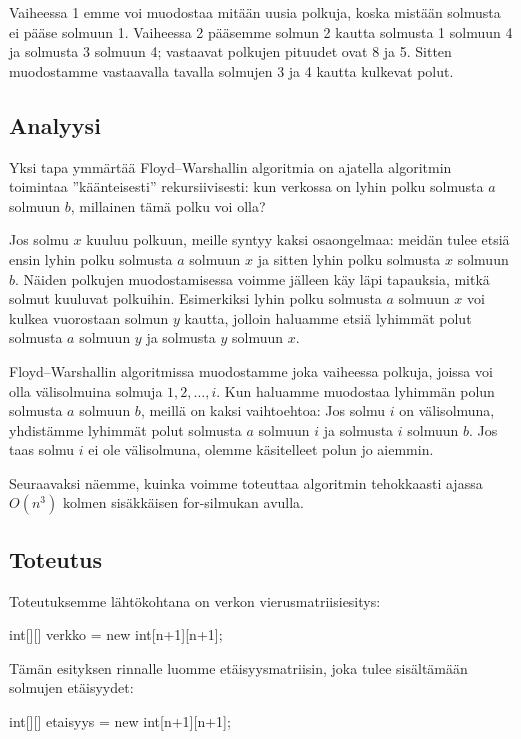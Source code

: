 Vaiheessa 1 emme voi muodostaa mitään uusia polkuja,
koska mistään solmusta ei pääse solmuun 1.
Vaiheessa 2 pääsemme solmun 2 kautta solmusta 1 solmuun 4 ja
solmusta 3 solmuun 4; vastaavat polkujen pituudet ovat 8 ja 5.
Sitten muodostamme vastaavalla tavalla solmujen 3 ja 4
kautta kulkevat polut.

\subsection{Analyysi}

Yksi tapa ymmärtää Floyd–Warshallin algoritmia on
ajatella algoritmin toimintaa ''käänteisesti'' rekursiivisesti:
kun verkossa on lyhin polku solmusta $a$ solmuun $b$,
millainen tämä polku voi olla?

Jos solmu $x$ kuuluu polkuun, meille syntyy kaksi osaongelmaa:
meidän tulee etsiä ensin lyhin polku solmusta $a$ solmuun $x$
ja sitten lyhin polku solmusta $x$ solmuun $b$.
Näiden polkujen muodostamisessa voimme jälleen käy läpi tapauksia,
mitkä solmut kuuluvat polkuihin.
Esimerkiksi lyhin polku solmusta $a$ solmuun $x$
voi kulkea vuorostaan solmun $y$ kautta,
jolloin haluamme etsiä lyhimmät polut solmusta $a$ solmuun $y$
ja solmusta $y$ solmuun $x$.

Floyd–Warshallin algoritmissa muodostamme joka vaiheessa
polkuja, joissa voi olla välisolmuina solmuja $1,2,\dots,i$.
Kun haluamme muodostaa lyhimmän polun solmusta $a$ solmuun $b$,
meillä on kaksi vaihtoehtoa:
Jos solmu $i$ on välisolmuna, yhdistämme lyhimmät polut
solmusta $a$ solmuun $i$ ja solmusta $i$ solmuun $b$.
Jos taas solmu $i$ ei ole välisolmuna, olemme käsitelleet
polun jo aiemmin. 

Seuraavaksi näemme, kuinka voimme toteuttaa algoritmin
tehokkaasti ajassa $O(n^3)$ kolmen sisäkkäisen for-silmukan avulla.

\subsection{Toteutus}

Toteutuksemme lähtökohtana on verkon vierusmatriisiesitys:

\begin{code}
int[][] verkko = new int[n+1][n+1];
\end{code}

Tämän esityksen rinnalle luomme etäisyysmatriisin,
joka tulee sisältämään solmujen etäisyydet:

\begin{code}
int[][] etaisyys = new int[n+1][n+1];
\end{code}

